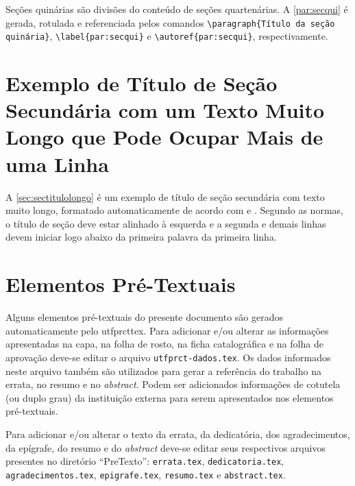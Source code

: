 Seções quinárias são divisões do conteúdo de seções quartenárias. A \autoref{par:secqui} é gerada, rotulada e referenciada pelos comandos \verb|\paragraph{Título da seção quinária}|, \verb|\label{par:secqui}| e \verb|\autoref{par:secqui}|, respectivamente.

\section{Exemplo de Título de Seção Secundária com um Texto Muito Longo que Pode Ocupar Mais de uma Linha}\label{sec:sectitulolongo}

A \autoref{sec:sectitulolongo} é um exemplo de título de seção secundária com texto muito longo, formatado automaticamente de acordo com  e . Segundo as normas, o título de seção deve estar alinhado à esquerda e a segunda e demais linhas devem iniciar logo abaixo da primeira palavra da primeira linha.

\section{Elementos Pré-Textuais}\label{sec:elempretext}

Alguns elementos pré-textuais do presente documento são gerados automaticamente pelo \gls{utfprcttex}. Para adicionar e/ou alterar as informações apresentadas na capa, na folha de rosto, na ficha catalográfica e na folha de aprovação deve-se editar o arquivo \texttt{utfprct-dados.tex}. Os dados informados neste arquivo também são utilizados para gerar a referência do trabalho na errata, no resumo e no \textit{abstract}. Podem ser adicionados informações de cotutela (ou duplo grau) da instituição externa para serem apresentados nos elementos pré-textuais.

Para adicionar e/ou alterar o texto da errata, da dedicatória, dos agradecimentos, da epígrafe, do resumo e do \textit{abstract} deve-se editar seus respectivos arquivos presentes no diretório ``PreTexto'': \texttt{errata.tex}, \texttt{dedicatoria.tex}, \texttt{agradecimentos.tex}, \texttt{epigrafe.tex}, \texttt{resumo.tex} e \texttt{abstract.tex}.

